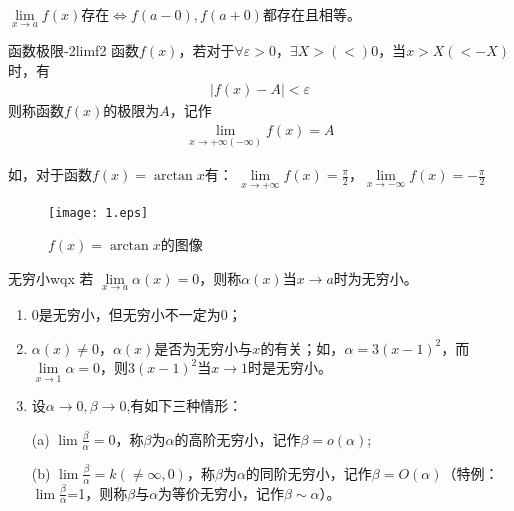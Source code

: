 \documentclass[cn,12pt,chinese]{elegantbook}
\begin{document}
\FiveStar $\lim\limits_{x \to a} f(x)$存在$\iff f(a-0),f(a+0)$都存在且相等。

\begin{definition}{函数极限-2}{limf2}
函数$f(x)$，若对于$ \forall\varepsilon>0 $，$ \exists X>(<)0 $，当$ x>X(<-X) $时，有
\begin{align}
    \vert{f(x)-A}\vert<\varepsilon
\end{align}
则称函数$f(x)$的极限为$A$，记作
\begin{align}
    \lim_{x\to +\infty(-\infty)} f(x)=A 
\end{align}
\end{definition}

如，对于函数$f(x)=\arctan{x}$有：
 $\lim\limits_{x\to +\infty} f(x)=\displaystyle\frac{\pi}{2}$，$\lim\limits_{x\to -\infty} f(x)=-\displaystyle \frac{\pi}{2}$

 \begin{figure}[htbp]
    \centering
    \texttt{[image: 1.eps]}
    \caption{$f(x)=\arctan{x}$的图像}
  \end{figure}
  
\begin{definition}{无穷小}{wqx}
若 $ \lim\limits_{x \to a} \alpha(x)=0$，则称$ \alpha(x)$当$x \to a$时为无穷小。
\end{definition}

\begin{note}
\begin{enumerate}
  \item 0是无穷小，但无穷小不一定为0；
  \item $\alpha(x)\neq 0$，$\alpha(x)$是否为无穷小与$ x $的有关；如，$\alpha=3(x-1)^2$，而$\lim\limits_{x \to 1}\alpha=0 $，则$3(x-1)^2$当$x \to 1$时是无穷小。
  \item 设$\alpha \to 0,\beta \to 0$,有如下三种情形：
  
  (a) $\lim \displaystyle\frac{\beta}{\alpha}=0$，称$ \beta $为$ \alpha $的高阶无穷小，记作$\beta=o(\alpha)$;
  
  (b) $\lim \displaystyle\frac{\beta}{\alpha}=k(\neq \infty,0)$，称$ \beta $为$ \alpha $的同阶无穷小，记作$\beta=O(\alpha)$（特例：$\lim \displaystyle\frac{\beta}{\alpha}$=1，则称$ \beta $与$ \alpha $为等价无穷小，记作$\beta \sim \alpha$）。
\end{enumerate}
\end{note}
\end{document}
